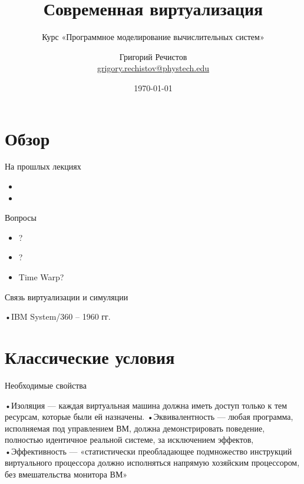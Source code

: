\documentclass{beamer}
\title{Современная виртуализация}
\subtitle{Курс «Программное моделирование вычислительных систем»}
\author[]{Григорий Речистов \\ \small{\href{mailto:grigory.rechistov@phystech.edu}{grigory.rechistov@phystech.edu}}}
\date{\today}
\begin{document}
\begin{frame}
\titlepage
\end{frame}

\begin{frame}
\tableofcontents
\end{frame}

\section{Обзор}

\begin{frame}{На прошлых лекциях}
\begin{itemize}
\item 
\item 
\end{itemize}

\end{frame}

\begin{frame}{Вопросы}
\begin{itemize}
\item ?\pause
\item ?\pause
\item Time Warp?
\end{itemize}

\end{frame}

\begin{frame}{Связь виртуализации и симуляции}

\end{frame}

\begin{frame}{}
•IBM System/360 – 1960 гг.

\end{frame}

\section{Классические условия}

\begin{frame}{Необходимые свойства}

•Изоляция — каждая виртуальная машина должна иметь
доступ только к тем ресурсам, которые были ей
назначены.
•Эквивалентность — любая программа, исполняемая под
управлением ВМ, должна демонстрировать поведение,
полностью идентичное реальной системе, за исключением
эффектов,
•Эффективность — «статистически преобладающее
подмножество инструкций виртуального процессора
должно исполняться напрямую хозяйским процессором,
без вмешательства монитора ВМ»

\end{frame}
\end{document}
